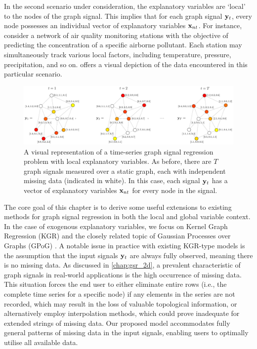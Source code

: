 In the second scenario under consideration, the explanatory variables are `local' to the nodes of the graph signal. This implies that for each graph signal $\mathbf{y}_t$, every node possesses an individual vector of explanatory variables $\mathbf{x}_{nt}$. For instance, consider a network of air quality monitoring stations with the objective of predicting the concentration of a specific airborne pollutant. Each station may simultaneously track various local factors, including temperature, pressure, precipitation, and so on.  offers a visual depiction of the data encountered in this particular scenario.

\begin{figure}[ht]
    \centering
    \includegraphics[width=\linewidth]{Figures/RNC_diagram.pdf}
    \caption[Graph signal regression with local variables]{A visual representation of a time-series graph signal regression problem with local explanatory variables. As before, there are $T$ graph signals measured over a static graph, each with independent missing data (indicated in white). In this case, each signal $\mathbf{y}_t$ has a vector of explanatory variables $\mathbf{x}_{nt}$ for every node in the signal. }
    \label{fig:RNC_diagram}
\end{figure}
  
The core goal of this chapter is to derive some useful extensions to existing methods for graph signal regression in both the local and global variable context. In the case of exogenous explanatory variables, we focus on Kernel Graph Regression (KGR) \citep{Venkitaraman2019,Elias2022} and the closely related topic of Gaussian Processes over Graphs (GPoG) \citep{Venkitaraman2020}. A notable issue in practice with existing KGR-type models is the assumption that the input signals $\mathbf{y}_t$ are always fully observed, meaning there is no missing data. As discussed in \cref{chap:gsr_2d}, a prevalent characteristic of graph signals in real-world applications is the high occurrence of missing data. This situation forces the end user to either eliminate entire rows (i.e., the complete time series for a specific node) if any elements in the series are not recorded, which may result in the loss of valuable topological information, or alternatively employ interpolation methods, which could prove inadequate for extended strings of missing data. Our proposed model accommodates fully general patterns of missing data in the input signals, enabling users to optimally utilise all available data.

